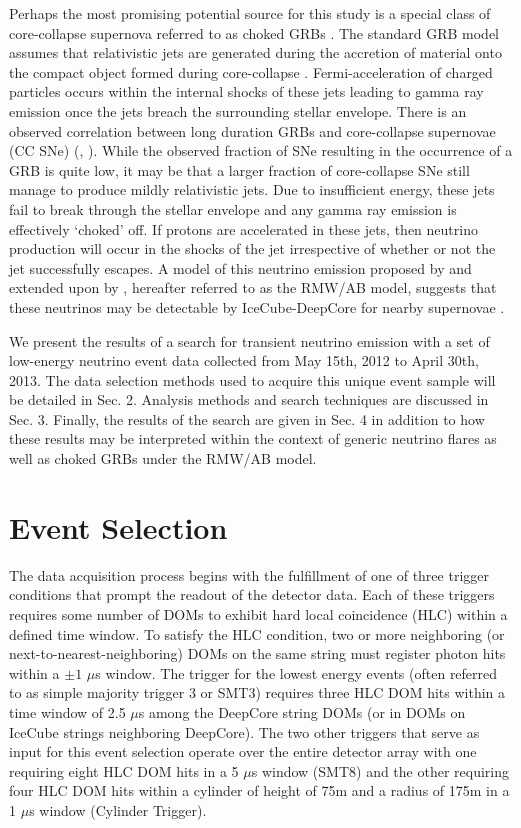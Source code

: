 \documentclass[manuscript]{aastex}
\begin{document}
Perhaps the most promising potential source for this study is a special class of core-collapse supernova referred to as choked GRBs \citep{2001PhRvL..87q1102M}. The standard GRB model assumes that relativistic jets are generated during the accretion of material onto the compact object formed during core-collapse \citep{1992MNRAS.258P..41R}. Fermi-acceleration of charged particles occurs within the internal shocks of these jets leading to gamma ray emission once the jets breach the surrounding stellar envelope. There is an observed correlation between long duration GRBs and core-collapse supernovae (CC SNe) (\citep{2006ARA&A..44..507W}, \citep{2011AN....332..434M}). While the observed fraction of SNe resulting in the occurrence of a GRB is quite low, it may be that a larger fraction of core-collapse SNe still manage to produce mildly relativistic jets.  Due to insufficient energy, these jets fail to break through the stellar envelope and any gamma ray emission is effectively `choked' off. If protons are accelerated in these jets, then neutrino production will occur in the shocks of the jet irrespective of whether or not the jet successfully escapes. A model of this neutrino emission proposed by \cite{2004PhRvL..93r1101R} and extended upon by \cite{2005PhRvL..95f1103A}, hereafter referred to as the RMW/AB model, suggests that these neutrinos may be detectable by IceCube-DeepCore for nearby supernovae \citep{PhysRevD.81.083011}.

We present the results of a search for transient neutrino emission with a set of low-energy neutrino event data collected from May 15th, 2012 to April 30th, 2013. The data selection methods used to acquire this unique event sample will be detailed in Sec. 2. Analysis methods and search techniques are discussed in Sec. 3. Finally, the results of the search are given in Sec. 4 in addition to how these results may be interpreted within the context of generic neutrino flares as well as choked GRBs under the RMW/AB model.
\section{Event Selection}

The data acquisition process begins with the fulfillment of one of three trigger conditions that prompt the readout of the detector data. Each of these triggers requires some number of DOMs to exhibit hard local coincidence (HLC) within a defined time window. To satisfy the HLC condition, two or more neighboring (or next-to-nearest-neighboring) DOMs on the same string must register photon hits within a $\pm1$ $\mu$s window. The trigger for the lowest energy events (often referred to as simple majority trigger 3 or SMT3) requires three HLC DOM hits within a time window of 2.5 $\mu$s among the DeepCore string DOMs (or in DOMs on IceCube strings neighboring DeepCore). The two other triggers that serve as input for this event selection operate over the entire detector array with one requiring eight HLC DOM hits in a 5 $\mu$s window (SMT8) and the other requiring four HLC DOM hits within a cylinder of height of 75m and a radius of 175m in a 1 $\mu$s window (Cylinder Trigger).
\end{document}

